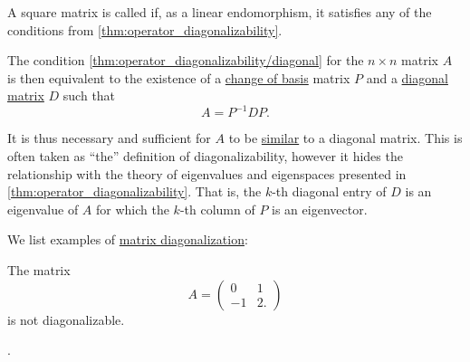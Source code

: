 \begin{definition}\label{def:diagonalizable_matrix}\mimprovised
  A square matrix is called  if, as a linear endomorphism, it satisfies any of the conditions from \cref{thm:operator_diagonalizability}.

  The condition \cref{thm:operator_diagonalizability/diagonal} for the \( n \times n \) matrix \( A \) is then equivalent to the existence of a \hyperref[con:change_of_basis]{change of basis} matrix \( P \) and a \hyperref[def:matrix_diagonal]{diagonal matrix} \( D \) such that
  \begin{equation*}
    A = P^{-1} D P.
  \end{equation*}

  It is thus necessary and sufficient for \( A \) to be \hyperref[def:similar_matrices]{similar} to a diagonal matrix. This is often taken as \enquote{the} definition of diagonalizability, however it hides the relationship with the theory of eigenvalues and eigenspaces presented in \cref{thm:operator_diagonalizability}. That is, the \( k \)-th diagonal entry of \( D \) is an eigenvalue of \( A \) for which the \( k \)-th column of \( P \) is an eigenvector.
\end{definition}

\begin{example}\label{ex:def:diagonalizable_matrix}
  We list examples of \hyperref[def:diagonalizable_matrix]{matrix diagonalization}:
  \begin{thmenum}
     The matrix
    \begin{equation*}
      A = \begin{pmatrix}
        0  & 1 \\
        -1 & 2.
      \end{pmatrix}
    \end{equation*}
    is not diagonalizable.

    .
  \end{thmenum}
\end{example}

